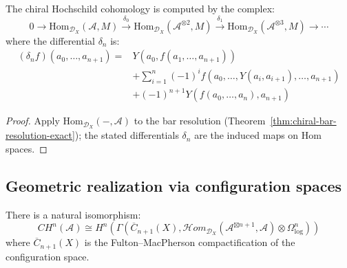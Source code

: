 \begin{theorem}
\label{thm:chiral-hochschild-complex}
The chiral Hochschild cohomology is computed by the complex:
\[
0 \to \text{Hom}_{\mathcal{D}_X}(\mathcal{A}, M) \xrightarrow{\delta_0} \text{Hom}_{\mathcal{D}_X}(\mathcal{A}^{\otimes 2}, M) \xrightarrow{\delta_1} \text{Hom}_{\mathcal{D}_X}(\mathcal{A}^{\otimes 3}, M) \to \cdots
\]
where the differential $\delta_n$ is:
\begin{align}
(\delta_n f)(a_0, \ldots, a_{n+1}) = &Y(a_0, f(a_1, \ldots, a_{n+1})) \\
&+ \sum_{i=1}^n (-1)^i f(a_0, \ldots, Y(a_i, a_{i+1}), \ldots, a_{n+1}) \\
&+ (-1)^{n+1} Y(f(a_0, \ldots, a_n), a_{n+1})
\end{align}
\end{theorem}
\begin{proof}
Apply $\mathrm{Hom}_{\mathcal{D}_X}(-, \mathcal{A})$ to the bar resolution (Theorem~\ref{thm:chiral-bar-resolution-exact}); the stated differentials $\delta_n$ are the induced maps on $\mathrm{Hom}$ spaces.
\end{proof}

\subsection{Geometric realization via configuration spaces}

\begin{theorem}
\label{thm:geometric-chiral-hochschild}
There is a natural isomorphism:
\[
CH^n(\mathcal{A}) \cong H^n\left(\Gamma\left(\overline{C}_{n+1}(X), \mathcal{H}om_{\mathcal{D}_X}(\mathcal{A}^{\boxtimes n+1}, \mathcal{A}) \otimes \Omega^n_{\log}\right)\right)
\]
where $\overline{C}_{n+1}(X)$ is the Fulton--MacPherson compactification of the configuration space.
\end{theorem}


